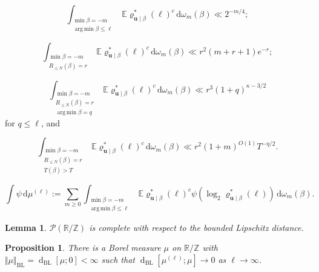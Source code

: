\documentclass[10pt,a4paper]{amsart}
\newtheorem{proposition}{Proposition}
\newtheorem{lemma}{Lemma}
\def\BL{\operatorname{BL}}
\newcommand\R{\mathbb{R}}
\newcommand\Z{\mathbb{Z}}
\DeclareMathOperator*{\argmin}{arg\,min}
\newcommand{\dist}[2]{{\operatorname{d}_{\operatorname{BL}}[#1;#2]}}
\renewcommand{\ge}{\geqslant}
\renewcommand{\le}{\leqslant}
\newcommand{\mb}{\mathbb}
\newcommand{\mbf}{\mathbf}
\begin{document}
\begin{equation}\label{exc-bd} \int_{\substack{\min \beta = -m \\ \argmin \beta \le \ell}} \mb{E} \varrho^*_{\mbf{u} \mid \beta}(\ell)^c\, \mathrm{d}\omega_m(\beta) \ll 2^{-m/4};\end{equation}

\begin{equation}\label{exc-rm-bd} \int_{\substack{\min \beta = -m \\ R_{\le N}(\beta) = r }} \mb{E} \varrho^*_{\mbf{u} \mid \beta}(\ell)^c\, \mathrm{d}\omega_m(\beta) \ll r^2(m + r + 1) e^{-r};\end{equation}

\begin{equation}\label{exc-qrm-bd} \int_{\substack{ \min \beta = -m \\ R_{\le N}(\beta) = r \\ \argmin \beta = q}} \mb{E} \varrho^*_{\mbf{u} \mid \beta}(\ell)^c\, \mathrm{d}\omega_m(\beta) \ll r^3 (1 + q)^{\kappa - 3/2} \end{equation} for $q \le \ell$, and

\begin{equation}\label{exc-mt-bd} \int_{\substack{\min \beta = -m \\ R_{\le N}(\beta) = r \\ T(\beta) > T}} \mb{E} \varrho^*_{\mbf{u} \mid \beta}(\ell)^c\, \mathrm{d}\omega_m(\beta) \ll r^{2}(1 + m)^{O(1)} T^{-\eta/2}.\end{equation}

\begin{equation}\label{mu-ell-def} \int \psi \, \mathrm{d} \mu^{(\ell)} := \sum_{m \ge 0}\int_{\substack{\min \beta = -m \\ \argmin \beta \le \ell}} \mb{E} \varrho^*_{\mbf{u} \mid \beta}(\ell)^c \psi (\log_2 \varrho^*_{\mbf{u} \mid \beta}(\ell)) \, \mathrm{d}\omega_m(\beta).\end{equation}

\begin{lemma}\label{completeness-measures}
$\mathcal{P}(\R/\Z)$ is complete with respect to the bounded Lipschitz distance.
\end{lemma}

\begin{proposition}\label{prop124}
There is a Borel measure $\mu$ on $\R/\Z$ with $\Vert \mu \Vert_{\BL} = \dist{\mu}{0} < \infty$ such that $\dist{\mu^{(\ell)}}{\mu} \rightarrow 0$ as $\ell \rightarrow \infty$.   
\end{proposition}
\end{document}
